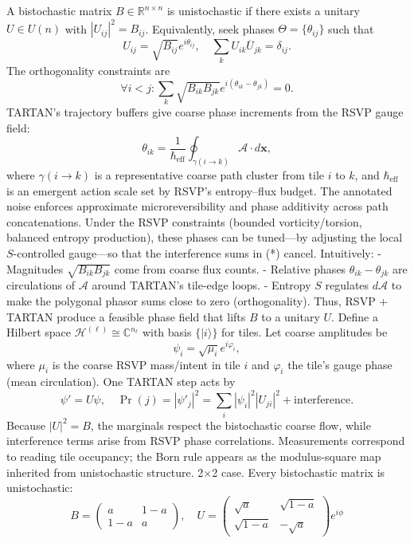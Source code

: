 \documentclass[11pt]{article}
\theoremstyle{plain}
\theoremstyle{definition}
\begin{document}
A bistochastic matrix $B \in \mathbb{R}^{n \times n}$ is unistochastic if there exists a unitary $U \in U(n)$ with $|U_{ij}|^2 = B_{ij}$. Equivalently, seek phases $\Theta = \{\theta_{ij}\}$ such that
\[
U_{ij} = \sqrt{B_{ij}} e^{i \theta_{ij}}, \quad \sum_k U_{ik} \overline{U}_{jk} = \delta_{ij}.
\]
The orthogonality constraints are
\[
\forall i < j: \sum_k \sqrt{B_{ik} B_{jk}} e^{i (\theta_{ik} - \theta_{jk})} = 0. \tag{*}
\]
TARTAN’s trajectory buffers give coarse phase increments from the RSVP gauge field:
\[
\theta_{ik} = \frac{1}{\hbar_{\mathrm{eff}}} \oint_{\gamma(i \to k)} \mathcal{A} \cdot d\bm{x},
\]
where $\gamma(i \to k)$ is a representative coarse path cluster from tile $i$ to $k$, and $\hbar_{\mathrm{eff}}$ is an emergent action scale set by RSVP’s entropy–flux budget. The annotated noise enforces approximate microreversibility and phase additivity across path concatenations. Under the RSVP constraints (bounded vorticity/torsion, balanced entropy production), these phases can be tuned—by adjusting the local $S$-controlled gauge—so that the interference sums in (*) cancel. Intuitively:
- Magnitudes $\sqrt{B_{ik} B_{jk}}$ come from coarse flux counts.
- Relative phases $\theta_{ik} - \theta_{jk}$ are circulations of $\mathcal{A}$ around TARTAN’s tile-edge loops.
- Entropy $S$ regulates $d\mathcal{A}$ to make the polygonal phasor sums close to zero (orthogonality).
Thus, RSVP + TARTAN produce a feasible phase field that lifts $B$ to a unitary $U$.
Define a Hilbert space $\mathcal{H}^{(\ell)} \cong \mathbb{C}^{n_\ell}$ with basis $\{|i\rangle\}$ for tiles. Let coarse amplitudes be
\[
\psi_i = \sqrt{\mu_i} e^{i \varphi_i},
\]
where $\mu_i$ is the coarse RSVP mass/intent in tile $i$ and $\varphi_i$ the tile’s gauge phase (mean circulation). One TARTAN step acts by
\[
\psi' = U \psi, \quad \Pr(j) = |\psi'_j|^2 = \sum_i |\psi_i|^2 |U_{ji}|^2 + \text{interference}.
\]
Because $|U|^2 = B$, the marginals respect the bistochastic coarse flow, while interference terms arise from RSVP phase correlations. Measurements correspond to reading tile occupancy; the Born rule appears as the modulus-square map inherited from unistochastic structure.
2$\times$2 case. Every bistochastic matrix is unistochastic:
\[
B = \begin{pmatrix} a & 1-a \\ 1-a & a \end{pmatrix}, \quad U = \begin{pmatrix} \sqrt{a} & \sqrt{1-a} \\ \sqrt{1-a} & -\sqrt{a} \end{pmatrix} e^{i\phi}
\]
\end{document}

